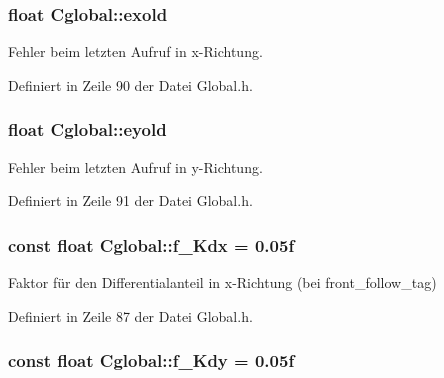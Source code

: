 \hypertarget{class_cglobal_ae7af3539af53f18897359057206803d3}{
\subsubsection[{exold}]{\setlength{\rightskip}{0pt plus 5cm}float {\bf Cglobal::exold}}}
\label{class_cglobal_ae7af3539af53f18897359057206803d3}


Fehler beim letzten Aufruf in x-\/Richtung. 



Definiert in Zeile 90 der Datei Global.h.

\hypertarget{class_cglobal_a5ea9466dbc474b2f9b469395ae8d688c}{
\subsubsection[{eyold}]{\setlength{\rightskip}{0pt plus 5cm}float {\bf Cglobal::eyold}}}
\label{class_cglobal_a5ea9466dbc474b2f9b469395ae8d688c}


Fehler beim letzten Aufruf in y-\/Richtung. 



Definiert in Zeile 91 der Datei Global.h.

\hypertarget{class_cglobal_a898e02a3650a5e6445aca8411ed79194}{
\subsubsection[{f\_\-Kdx}]{\setlength{\rightskip}{0pt plus 5cm}const float {\bf Cglobal::f\_\-Kdx} = 0.05f}}
\label{class_cglobal_a898e02a3650a5e6445aca8411ed79194}


Faktor für den Differentialanteil in x-\/Richtung (bei front\_\-follow\_\-tag) 



Definiert in Zeile 87 der Datei Global.h.

\hypertarget{class_cglobal_a8ff8f3e1711db988e5a936af1d5f2d42}{
\subsubsection[{f\_\-Kdy}]{\setlength{\rightskip}{0pt plus 5cm}const float {\bf Cglobal::f\_\-Kdy} = 0.05f}}
\label{class_cglobal_a8ff8f3e1711db988e5a936af1d5f2d42}


